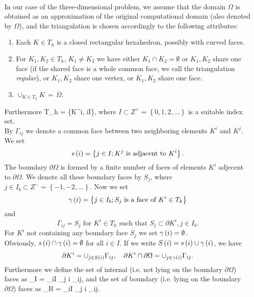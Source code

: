 \paragraph{}
In our case of the three-dimensional problem, we assume that the domain $\Omega$ is obtained as an approximation of the original computational domain (also denoted by $\Omega$), and the triangulation is chosen accordingly to the following attributes:
\renewcommand{\labelenumi}{\Alph{enumi})}
\begin{enumerate}
    \item Each $K\in T_h$ is a closed rectangular hexahedron, possibly with curved faces.
    \item For $K_1,K_2\in T_h,\,K_1\neq{K}_2$ we have either $K_1\cap{K}_2 = \emptyset$ or $K_1,K_2$ share one face (if the shared face is a whole common face, we call the triangulation \emph{regular}), or $K_1,K_2$ share one vertex, or $K_1,K_2$ share one face.
    \item$\cup_{K\in T_h}K\,=\,\overline{\Omega}.$
\end{enumerate}
Furthermore
\be
\label{Idef}  T_h = \left\{K^i, i\in I\right\},
\ee
where $I\subset Z^+ = \left\{0, 1, 2, ...\right\}$ is a suitable index set.\\
By $\Gamma_{ij}$ we denote a common face between two
neighboring elements $K^i$ and $K^j$. We set 
$$s
\left( i\right) = \left\{j\in I; K^j \text{ is adjacent to } K^i\right\}.
$$
The boundary $\partial\Omega$ is formed by a finite number of faces of elements $K^i$ adjecent to
$\partial\Omega$. We denote all these boundary faces by $S_j$, where $j\in I_b\subset Z^{-} = \left\{-1, -2, ...\right\}$.
Now we set 
$$
\gamma\left( i \right) = \left\{j\in I_b; S_j \text{ is a face of } K^i\in T_h\right\}
$$ 
and 
$$
\Gamma_{ij} = S_j\text{ for } K^i\in  T_h\text{ such that }S_j\subset\partial K^i, j\in I_b.
$$
For $K^i$ not containing any boundary face $S_j$ we set $\gamma\left( i \right) = \emptyset$.\\
Obviously, $s\left( i \right) \cap\gamma\left( i\right) = \emptyset$ for all $i\in I$. If we write $S\left( i \right) = s \left( i\right) \cup \gamma\left( i \right)$, we have
$$
\partial K^i = \cup_{j\in S\left( i \right)}\Gamma_{ij},\ \ \ \partial K^i\cap\partial{\Omega} = \cup_{j\in\gamma\left( i \right)}\Gamma_{ij}.
$$
Furthermore we define the set of internal (i.e. not lying on the boundary $\partial\Omega$) faces as
\be
\label{InternalEdges} \Gamma_I = \cup_{i\in I} \cup_{j \notin \gamma\lo i \ro} \Gamma_{ij},
\ee
and the set of boundary (i.e. lying on the boundary $\partial\Omega$) faces as
\be
\label{BndEdges} \Gamma_B = \cup_{i\in I} \cup_{j \in \gamma\lo i \ro} \Gamma_{ij}.
\ee
